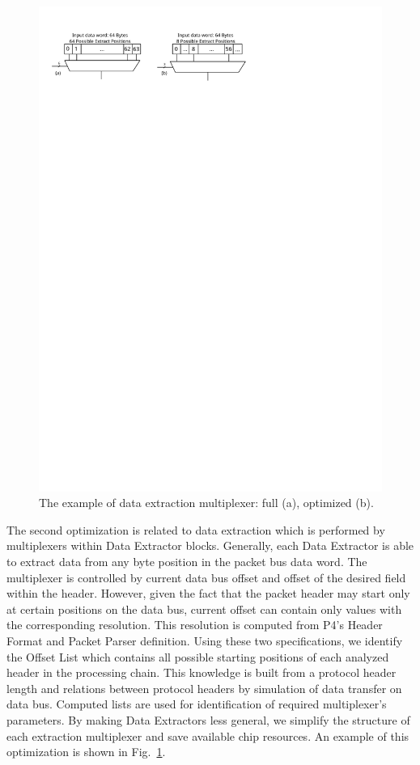 \begin{figure}[b]
    \centering
    \includegraphics[scale=0.91]{chapters/pic/MuxOpt}
    \caption{The example of data extraction multiplexer: full (a), optimized (b).}
    \label{fig:muxOpt}
\end{figure}

The second optimization is related to data extraction which is performed by multiplexers within Data Extractor blocks. 
Generally, each Data Extractor is able to extract data 
from any byte position in the packet bus data word. The multiplexer is controlled by current data bus offset and offset of the 
desired field within the header. However, given the fact that the packet header may start only at certain positions on the data bus, current 
offset can contain only values with the corresponding resolution. 
This resolution is computed from P4's Header Format and Packet Parser definition. 
Using these two specifications, we identify the Offset List which contains all possible starting positions of each analyzed header in 
the processing chain. 
This knowledge is built from a protocol header length and relations between protocol headers by simulation of data transfer on data bus.
Computed lists are used for identification of required multiplexer's parameters. 
By making Data Extractors less general, we simplify the structure of each extraction multiplexer and save available chip resources. 
An example of this optimization is shown in Fig.~\ref{fig:muxOpt}. 

